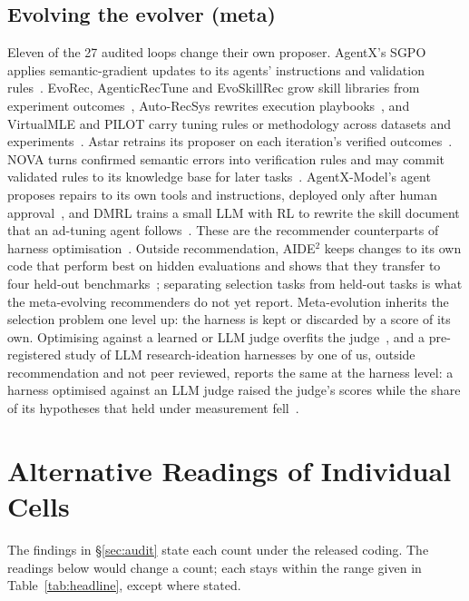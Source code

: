 \documentclass[sigconf,nonacm]{acmart}
\begin{document}
\subsection{Evolving the evolver (meta)}
Eleven of the 27 audited loops change their own proposer. AgentX's SGPO applies semantic-gradient updates to its
agents' instructions and validation rules~\cite{lao2026agentx}. EvoRec, AgenticRecTune and EvoSkillRec grow skill
libraries from experiment outcomes~\cite{mu2026evorec,wu2026agenticrectune,li2026evoskillrec}, Auto-RecSys rewrites
execution playbooks~\cite{li2026autorecsys}, and VirtualMLE and PILOT carry tuning rules or methodology across datasets and
experiments~\cite{cao2026virtualmle,pilot2026}. Astar retrains its proposer on each iteration's verified
outcomes~\cite{hu2026astar}. NOVA turns confirmed semantic errors into verification rules and may commit validated
rules to its knowledge base for later tasks~\cite{liu2026nova}. AgentX-Model's agent proposes repairs to its own tools
and instructions, deployed only after human approval~\cite{yang2026agentxmodel}, and DMRL trains a small LLM with RL to rewrite the skill document
that an ad-tuning agent follows~\cite{zhang2026dmrl}. These are the recommender counterparts of harness
optimisation~\cite{lee2026metaharness,xu2026harness2,lou2026autoharness}. Outside recommendation, AIDE$^2$ keeps changes
to its own code that perform best on hidden evaluations and shows that they transfer to four held-out
benchmarks~\cite{srikanth2026aide2}; separating selection tasks from held-out tasks is what the meta-evolving
recommenders do not yet report. Meta-evolution inherits the selection
problem one level up: the harness is kept or discarded by a score of its own. Optimising against a learned or LLM judge
overfits the judge~\cite{gao2023overoptimization}, and a pre-registered study of LLM research-ideation harnesses by one
of us, outside recommendation and not peer reviewed, reports the same at the harness level: a harness optimised against
an LLM judge raised the judge's scores while the share of its hypotheses that held under measurement
fell~\cite{yang2026ideationgoodhart}.


\section{Alternative Readings of Individual Cells}\label{app:readings}

The findings in \S\ref{sec:audit} state each count under the released coding. The readings below would change a count;
each stays within the range given in Table~\ref{tab:headline}, except where stated.
\end{document}
